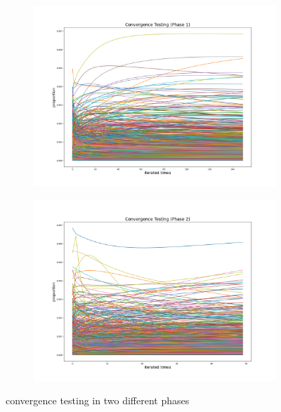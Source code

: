 \documentclass[12pt]{article}
\theoremstyle{definition}
\begin{document}
\begin{figure}
  \centering
  \begin{subfigure}[t]{0.8\textwidth}
    \includegraphics[width=\textwidth]{SD1_dev.png}
    \caption{}
  \end{subfigure}
  \begin{subfigure}[t]{0.8\textwidth}
    \includegraphics[width=\textwidth]{SD2_dev.png}
    \caption{}
  \end{subfigure}
  \caption{convergence testing in two different phases}
  \label{fig:convergence_test}
\end{figure}
\end{document}
